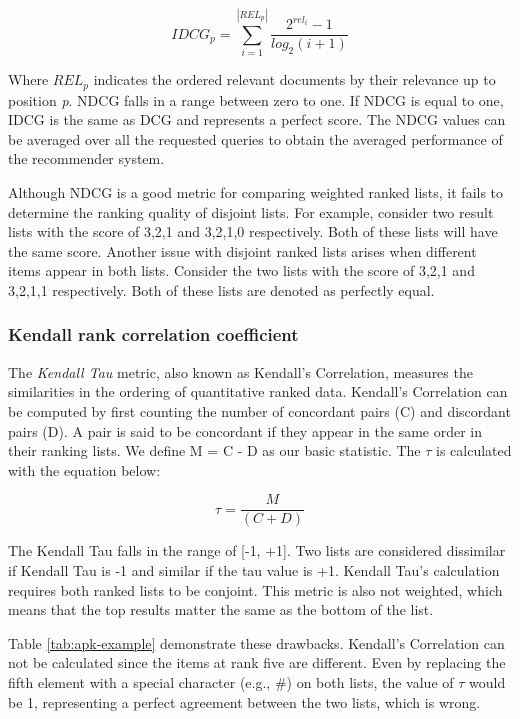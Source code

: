 \begin{equation}
    IDCG_p = \sum_{i=1}^{|REL_p|}\frac{2^{rel_i}-1}{log_2(i+1)}
    \label{eq:idcg}
\end{equation}

Where \emph{$REL_p$} indicates the ordered relevant documents by their relevance up to position \emph{p}. NDCG falls in a range between zero to one. If NDCG is equal to one, IDCG is the same as DCG and represents a perfect score. The NDCG values can be averaged over all the requested queries to obtain the averaged performance of the recommender system.


Although NDCG is a good metric for comparing weighted ranked lists, it fails to determine the ranking quality of disjoint lists. For example, consider two result lists with the score of 3,2,1 and 3,2,1,0 respectively. Both of these lists will have the same score. Another issue with disjoint ranked lists arises when different items appear in both lists. Consider the two lists with the score of 3,2,1 and 3,2,1,1 respectively. Both of these lists are denoted as perfectly equal.


\subsubsection{Kendall rank correlation coefficient}
The \emph{Kendall Tau} \cite{kendallNewMeasureRank1938} metric, also known as Kendall's Correlation, measures the similarities in the ordering of quantitative ranked data. Kendall's Correlation can be computed by first counting the number of concordant pairs (C) and discordant pairs (D). A pair is said to be concordant if they appear in the same order in their ranking lists. We define M = C - D as our basic statistic. The $\tau$ is calculated with the equation below: 

\begin{equation}
    \tau = \frac{M}{(C+D)}
    \label{eq:kendall-tau}
\end{equation}

The Kendall Tau falls in the range of [-1, +1]. Two lists are considered dissimilar if Kendall Tau is -1 and similar if the tau value is +1. Kendall Tau's calculation requires both ranked lists to be conjoint. This metric is also not weighted, which means that the top results matter the same as the bottom of the list.

Table \ref{tab:apk-example} demonstrate these drawbacks. Kendall's Correlation can not be calculated since the items at rank five are different. Even by replacing the fifth element with a special character (e.g., \#) on both lists, the value of $\tau$ would be 1, representing a perfect agreement between the two lists, which is wrong.

